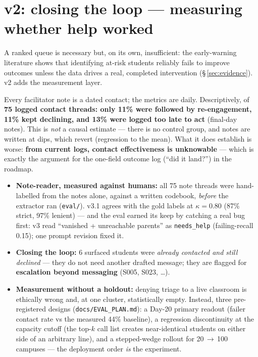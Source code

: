 \documentclass[11pt,paper=a4,parskip=half,DIV=11]{scrartcl}
\begin{document}
\section{v2: closing the loop --- measuring whether help worked}
A ranked queue is necessary but, on its own, insufficient: the early-warning literature shows that
identifying at-risk students reliably fails to improve outcomes unless the data drives a real,
completed intervention (\S\,\ref{sec:evidence}). v2 adds the measurement layer.

\begin{insight}
Every facilitator note is a dated contact; the metrics are daily. Descriptively, of \textbf{75 logged
contact threads: only 11\% were followed by re-engagement, 11\% kept declining, and 13\% were logged
too late to act} (final-day notes). This is \emph{not} a causal estimate --- there is no control group,
and notes are written at dips, which revert (regression to the mean). What it does establish is worse:
\textbf{from current logs, contact effectiveness is unknowable} --- which is exactly the argument for
the one-field outcome log (``did it land?'') in the roadmap.
\end{insight}

\begin{itemize}
\item \textbf{Note-reader, measured against humans:} all 75 note threads were hand-labelled from the
notes alone, against a written codebook, \emph{before} the extractor ran (\texttt{eval/}). v3.1 agrees
with the gold labels at \(\kappa=0.80\) (87\% strict, 97\% lenient) --- and the eval earned its keep
by catching a real bug first: v3 read ``vanished + unreachable parents'' as \texttt{needs\_help}
(failing-recall 0.15); one prompt revision fixed it.
\item \textbf{Closing the loop:} 6 surfaced students were \emph{already contacted and still declined} ---
they do not need another drafted message; they are flagged for \textbf{escalation beyond messaging}
(S005, S023, \dots).
\item \textbf{Measurement without a holdout:} denying triage to a live classroom is ethically wrong
and, at one cluster, statistically empty. Instead, three pre-registered designs
(\texttt{docs/EVAL\_PLAN.md}): a Day-20 primary readout (failer contact rate vs the measured 44\%
baseline), a regression discontinuity at the capacity cutoff (the top-\(k\) call list creates
near-identical students on either side of an arbitrary line), and a stepped-wedge rollout for
20\,$\to$\,100 campuses --- the deployment order \emph{is} the experiment.
\end{itemize}
\end{document}
